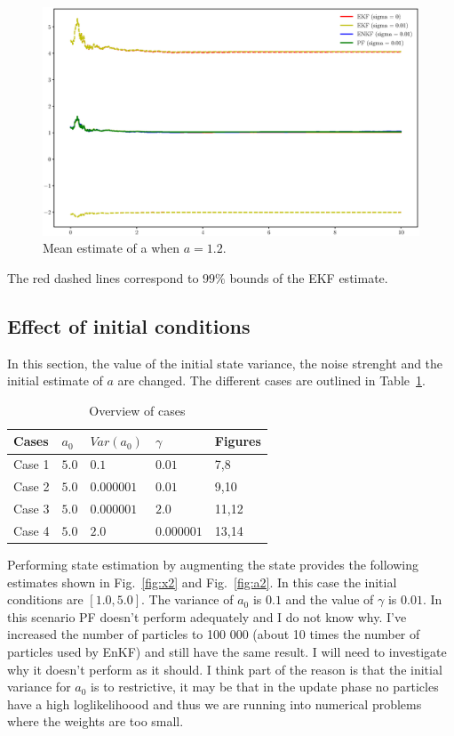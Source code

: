 \documentclass[]{elsarticle}
\begin{document}
\begin{figure}[!hptb]
\centering
\includegraphics[width=\linewidth,keepaspectratio]{./figs/case00_a_estimate.eps}
\caption{Mean estimate of a when $a=1.2$.}
\label{fig:a1}
\end{figure}

The red dashed lines correspond to $99\%$ bounds of the EKF estimate.

\subsection*{Effect of initial conditions}

In this section, the value of the initial state variance, the noise strenght and the initial estimate of $a$ are changed. The different cases are outlined in Table~\ref{table:1}. 
\begin{table}[]
\centering
\caption{Overview of cases}
\label{table:1}
\begin{tabular}{|l|lll|l|}
\hline
Cases  & $a_0$  & $Var(a_0)$  & $\gamma$ & Figures \\
\hline
Case 1 & $5.0$ & $0.1$  & $0.01$ & 7,8 \\
Case 2 & $5.0$ & $0.000001$ & $0.01$ & 9,10 \\
Case 3 & $5.0$ & $0.000001$ & $2.0$ & 11,12\\
Case 4 & $5.0$ & $2.0$  &   $0.000001$ & 13,14\\
\hline
\end{tabular}
\end{table}

Performing state estimation by augmenting the state provides the following estimates shown in Fig.~\ref{fig:x2} and Fig.~\ref{fig:a2}. In this case the initial conditions are $[1.0, 5.0]$. The variance of $a_0$ is $0.1$ and the value of $\gamma$ is $0.01$. In this scenario PF doesn't perform adequately and I do not know why. I've increased the number of particles to 100 000 (about 10 times the number of particles used by EnKF) and still have the same result. I will need to investigate why it doesn't perform as it should. I think part of the reason is that the initial variance for $a_0$ is to restrictive, it may be that in the update phase no particles have a high loglikelihoood and thus we are running into numerical problems where the weights are too small.
\end{document}
